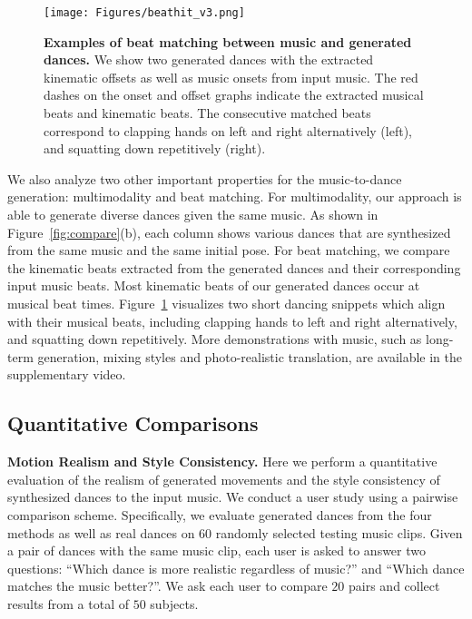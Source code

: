 \documentclass{article}
\newlength\figmargin
\newlength\secmargin
\newlength\subsecmargin
\newcommand{\figref}[1]{Figure~\ref{fig:#1}}
\begin{document}
\begin{figure}
    \centering
    \texttt{[image: Figures/beathit\_v3.png]}
    \caption{\textbf{Examples of beat matching between music and generated dances.}
    We show two generated dances with the extracted kinematic offsets as well as music onsets from input music. 
The red dashes on the onset and offset graphs indicate the extracted musical beats and kinematic beats.
The consecutive matched beats correspond to clapping hands on left and right alternatively (left), and squatting down repetitively (right).
}
    \label{fig:beathit}
    \vspace{\figmargin}
\end{figure}



We also analyze two other important properties for the music-to-dance generation: multimodality and beat matching. 
For multimodality, our approach is able to generate diverse dances given the same music.
As shown in \figref{compare}(b), each column shows various dances that are synthesized from the same music and the same initial pose. 
For beat matching, we compare the kinematic beats extracted from the generated dances and their corresponding input music beats. Most kinematic beats of our generated dances occur at musical beat times.
\figref{beathit} visualizes two short dancing snippets which align with their musical beats, including clapping hands to left and right alternatively, and squatting down repetitively. More demonstrations with music, such as long-term generation, mixing styles and photo-realistic translation, are available in the supplementary video.   

\vspace{\subsecmargin}
\subsection{Quantitative Comparisons}
\label{subsec:quan}
\vspace{\subsecmargin}


\textbf{Motion Realism and Style Consistency.}
Here we perform a quantitative evaluation of the realism of generated movements and the style consistency of synthesized dances to the input music.
We conduct a user study using a pairwise comparison scheme. 
Specifically, we evaluate generated dances from the four methods as well as real dances on $60$ randomly selected testing music clips.
Given a pair of dances with the same music clip, each user is asked to answer two questions: ``Which dance is more realistic regardless of music?'' and ``Which dance matches the music better?''.
We ask each user to compare $20$ pairs and collect results from a total of $50$ subjects. 
\end{document}
